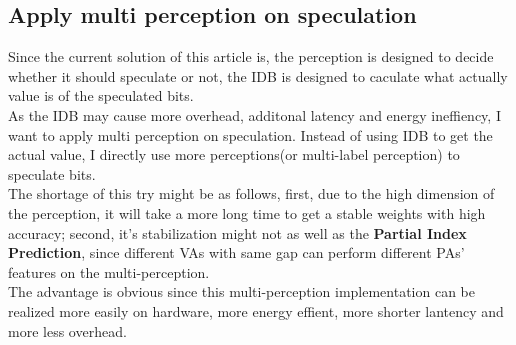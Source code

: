 \documentclass[10pt,a4paper]{article}
\begin{document}
\subsection{Apply multi perception on speculation}
Since the current solution of this article is, the perception is designed to decide whether it should speculate or not, the IDB is designed to caculate what actually value is of the speculated bits.\\
As the IDB may cause more overhead, additonal latency and energy ineffiency, I want to apply multi perception on speculation. Instead of using IDB to get the actual value, I directly use more perceptions(or multi-label perception) to speculate bits.\\
The shortage of this try might be as follows, first, due to the high dimension of the perception, it will take a more long time to get a stable weights with high accuracy; second, it's stabilization might not as well as the \textbf{Partial Index Prediction}, since different VAs with same gap can perform different PAs' features on the multi-perception.\\
The advantage is obvious since this multi-perception implementation can be realized more easily on hardware, more energy effient, more shorter lantency and more less overhead.
\end{document}
